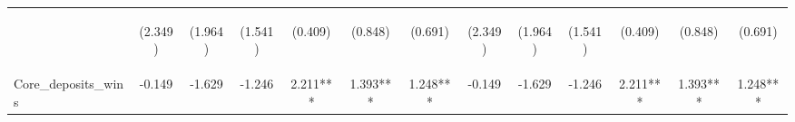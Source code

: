 \documentclass[]{article}
\begin{document}
\begin{center}
\begin{tabular}{lcccccccccccc}
\vspace{4pt} & \begin{footnotesize}(2.349)\end{footnotesize} & \begin{footnotesize}(1.964)\end{footnotesize} & \begin{footnotesize}(1.541)\end{footnotesize} & \begin{footnotesize}(0.409)\end{footnotesize} & \begin{footnotesize}(0.848)\end{footnotesize} & \begin{footnotesize}(0.691)\end{footnotesize} & \begin{footnotesize}(2.349)\end{footnotesize} & \begin{footnotesize}(1.964)\end{footnotesize} & \begin{footnotesize}(1.541)\end{footnotesize} & \begin{footnotesize}(0.409)\end{footnotesize} & \begin{footnotesize}(0.848)\end{footnotesize} & \begin{footnotesize}(0.691)\end{footnotesize} \\
Core\_deposits\_wins & -0.149 & -1.629 & -1.246 & 2.211*** & 1.393*** & 1.248*** & -0.149 & -1.629 & -1.246 & 2.211*** & 1.393*** & 1.248*** \\

\end{tabular}
\end{center}
\end{document}

